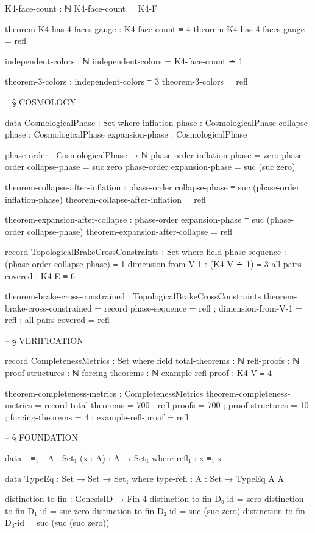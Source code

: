 \documentclass[11pt,a4paper]{book}
\begin{document}
\begin{code}
K4-face-count : ℕ
K4-face-count = K4-F

theorem-K4-has-4-faces-gauge : K4-face-count ≡ 4
theorem-K4-has-4-faces-gauge = refl

independent-colors : ℕ
independent-colors = K4-face-count ∸ 1

theorem-3-colors : independent-colors ≡ 3
theorem-3-colors = refl


-- § COSMOLOGY

data CosmologicalPhase : Set where
  inflation-phase : CosmologicalPhase
  collapse-phase  : CosmologicalPhase
  expansion-phase : CosmologicalPhase

phase-order : CosmologicalPhase → ℕ
phase-order inflation-phase = zero
phase-order collapse-phase = suc zero
phase-order expansion-phase = suc (suc zero)

theorem-collapse-after-inflation : phase-order collapse-phase ≡ suc (phase-order inflation-phase)
theorem-collapse-after-inflation = refl

theorem-expansion-after-collapse : phase-order expansion-phase ≡ suc (phase-order collapse-phase)
theorem-expansion-after-collapse = refl

record TopologicalBrakeCrossConstraints : Set where
  field
    phase-sequence     : (phase-order collapse-phase) ≡ 1
    dimension-from-V-1 : (K4-V ∸ 1) ≡ 3
    all-pairs-covered  : K4-E ≡ 6

theorem-brake-cross-constrained : TopologicalBrakeCrossConstraints
theorem-brake-cross-constrained = record
  { phase-sequence = refl
  ; dimension-from-V-1 = refl
  ; all-pairs-covered = refl
  }


-- § VERIFICATION

record CompletenessMetrics : Set where
  field
    total-theorems      : ℕ
    refl-proofs         : ℕ
    proof-structures    : ℕ
    forcing-theorems    : ℕ
    example-refl-proof   : K4-V ≡ 4

theorem-completeness-metrics : CompletenessMetrics
theorem-completeness-metrics = record
  { total-theorems = 700
  ; refl-proofs = 700
  ; proof-structures = 10
  ; forcing-theorems = 4
  ; example-refl-proof = refl
  }


-- § FOUNDATION

data _≡₁_ {A : Set₁} (x : A) : A → Set₁ where
  refl₁ : x ≡₁ x

data TypeEq : Set → Set → Set₁ where
  type-refl : {A : Set} → TypeEq A A

distinction-to-fin : GenesisID → Fin 4
distinction-to-fin D₀-id = zero
distinction-to-fin D₁-id = suc zero
distinction-to-fin D₂-id = suc (suc zero)
distinction-to-fin D₃-id = suc (suc (suc zero))


\end{code}
\end{document}
